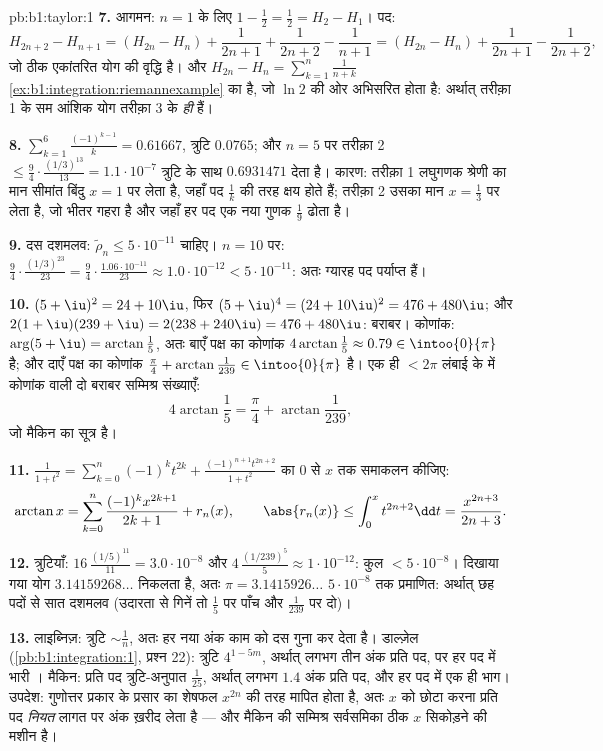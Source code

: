 \begin{solution}{pb:b1:taylor:1}
\textbf{7.} आगमन: $n = 1$ के लिए $1 - \frac12 = \frac12 = H_2 - H_1$। पद:
\[
H_{2n+2} - H_{n+1} = (H_{2n} - H_n) + \frac{1}{2n+1} +
\frac{1}{2n+2} - \frac{1}{n+1}
= (H_{2n} - H_n) + \frac{1}{2n+1} - \frac{1}{2n+2},
\]
जो ठीक एकांतरित योग की वृद्धि है। और $H_{2n} - H_n =
\sum_{k=1}^{n}\frac{1}{n+k}$ \cref{ex:b1:integration:riemannexample} का
 है, जो $\ln 2$ की ओर अभिसरित होता है: अर्थात् तरीक़ा 1 के सम आंशिक
योग तरीक़ा 3 के  \emph{ही} हैं।

\textbf{8.} $\sum_{k=1}^{6}\frac{(-1)^{k-1}}{k} = 0.61667$, त्रुटि $0.0765$;
और $n = 5$ पर तरीक़ा 2 $\leq \frac94\cdot\frac{(1/3)^{13}}{13} =
1.1\cdot10^{-7}$ त्रुटि के साथ $0.6931471$ देता है। कारण: तरीक़ा 1 लघुगणक
श्रेणी का मान सीमांत बिंदु $x = 1$ पर लेता है, जहाँ पद $\frac1k$ की तरह क्षय
होते हैं; तरीक़ा 2 उसका मान $x = \frac13$ पर लेता है, जो भीतर गहरा है और
जहाँ हर पद एक नया गुणक $\frac19$ ढोता है।

\textbf{9.} दस दशमलव: $\tilde\rho_n \leq 5\cdot10^{-11}$ चाहिए। $n = 10$ पर:
$\frac94 \cdot \frac{(1/3)^{23}}{23} =
\frac94\cdot\frac{1.06\cdot10^{-11}}{23} \approx 1.0\cdot10^{-12} <
5\cdot10^{-11}$: अतः ग्यारह पद पर्याप्त हैं।

\textbf{10.} $(5+\iu)^2 = 24 + 10\iu$, फिर $(5+\iu)^4 = (24 + 10\iu)^2 = 476
+ 480\iu$; और $2(1+\iu)(239+\iu) = 2(238 + 240\iu) = 476 + 480\iu$: बराबर।
कोणांक: $\arg(5 + \iu) = \arctan\frac15$, अतः बाएँ पक्ष का कोणांक
$4\arctan\frac15 \approx 0.79 \in \intoo{0}{\pi}$ है; और दाएँ पक्ष का कोणांक
$\frac\pi4 + \arctan\frac{1}{239} \in \intoo{0}{\pi}$ है। एक ही $< 2\pi$
लंबाई के  में कोणांक वाली दो बराबर सम्मिश्र संख्याएँ:
\[
4\arctan\frac15 = \frac\pi4 + \arctan\frac{1}{239} ,
\]
जो मैकिन का सूत्र है।

\textbf{11.} $\frac{1}{1+t^2} = \sum_{k=0}^n (-1)^k t^{2k} +
\frac{(-1)^{n+1}t^{2n+2}}{1+t^2}$ का $0$ से $x$ तक समाकलन कीजिए:
\[
\arctan x = \sum_{k=0}^{n}\frac{(-1)^k x^{2k+1}}{2k+1} +
r_n(x),
\qquad
\abs{r_n(x)} \leq \int_0^x t^{2n+2}\dd t =
\frac{x^{2n+3}}{2n+3} .
\]

\textbf{12.} त्रुटियाँ: $16\,\frac{(1/5)^{11}}{11} = 3.0\cdot 10^{-8}$ और
$4\,\frac{(1/239)^5}{5} \approx 1\cdot10^{-12}$: कुल $< 5\cdot10^{-8}$।
दिखाया गया योग $3.14159268\dots$ निकलता है, अतः $\pi = 3.1415926\dots$
$5\cdot10^{-8}$ तक प्रमाणित: अर्थात् छह पदों से सात दशमलव (उदारता से गिनें
तो $\frac15$ पर पाँच और $\frac1{239}$ पर दो)।

\textbf{13.} लाइब्निज़: त्रुटि $\sim \frac1n$, अतः हर नया अंक काम को दस गुना
कर देता है। डाल्ज़ेल (\cref{pb:b1:integration:1}, प्रश्न 22): त्रुटि
$4^{1-5m}$, अर्थात् लगभग तीन अंक प्रति पद, पर हर पद में भारी । मैकिन:
प्रति पद त्रुटि-अनुपात $\frac{1}{25}$, अर्थात् लगभग $1.4$ अंक प्रति पद, और
हर पद में एक ही भाग। उपदेश: गुणोत्तर प्रकार के प्रसार का शेषफल $x^{2n}$ की
तरह मापित होता है, अतः $x$ को छोटा करना प्रति पद \emph{नियत} लागत पर अंक
ख़रीद लेता है --- और मैकिन की सम्मिश्र सर्वसमिका ठीक $x$ सिकोड़ने की मशीन
है।


\end{solution}
